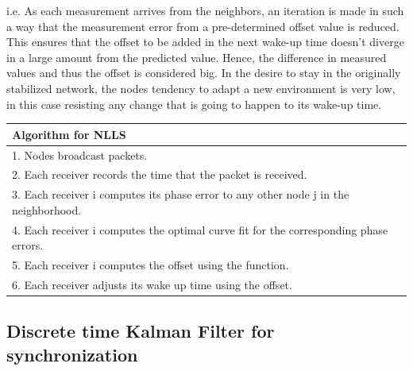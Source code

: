 \documentclass[a4paper,10pt]{report}
\begin{document}
i.e. \newline \newline
As each measurement arrives from the neighbors, an iteration is made in such a way that the measurement error from a pre-determined offset value is reduced. This ensures that the offset to be added in the next wake-up time doesn't diverge in a large amount from the predicted value. Hence, the difference in measured values and thus the offset is considered big. In the desire to stay in the originally stabilized
network, the nodes tendency to adapt a new environment is very low, in this case resisting any change that is going to happen to its
wake-up time. \newline
\newline
\begin{tabular}{  l }Algorithm for NLLS \\\hline
1. Nodes broadcast packets. \\  2. Each receiver records the time that the packet is received. \\
3. Each receiver i computes its phase error to any other node j in the neighborhood. \\
4. Each receiver i computes the optimal curve fit for the corresponding phase errors. \\
5. Each receiver i computes the offset using the function. \\
6. Each receiver adjusts its wake up time using the offset.\\
\hline
\end{tabular}
\subsection{\textbf{Discrete time Kalman Filter for synchronization}}
\end{document}
